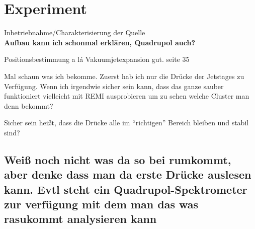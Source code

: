 \chapter{Experiment} 

Inbetriebnahme/Charakterisierung der Quelle\\

\textbf{Aufbau kann ich schonmal erklären, Quadrupol auch?}

Positionsbestimmung a lá Vakuumjetexpansion gut. seite 35

Mal schaun was ich bekomme. Zuerst hab ich nur die Drücke der Jetstages zu Verfügung. Wenn ich irgendwie sicher sein kann, dass das ganze sauber funktioniert vielleicht mit REMI ausprobieren um zu sehen welche Cluster man denn bekommt?

Sicher sein heißt, dass die Drücke alle im \enquote{richtigen} Bereich bleiben und stabil sind?

\section{Weiß noch nicht was da so bei rumkommt, aber denke dass man da erste Drücke auslesen kann. Evtl steht ein Quadrupol-Spektrometer zur verfügung mit dem man das was rasukommt analysieren kann}
